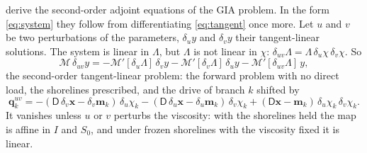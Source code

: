 \documentclass[11pt,a4paper]{article}
\numberwithin{equation}{section}
\begin{document}
\citet{YuEtAl2025} derive the second-order adjoint equations of the GIA
problem. In the form \eqref{eq:system} they follow from differentiating
\eqref{eq:tangent} once more. Let $u$ and $v$ be two perturbations of the
parameters, $\delta_{u}y$ and $\delta_{v}y$ their tangent-linear solutions. The
system is linear in $\Lambda$, but $\Lambda$ is not linear in $\chi$:
$\delta_{uv}\Lambda = \Lambda\,\delta_{u}\chi\,\delta_{v}\chi$. So
\begin{equation}
\mathcal{M}\,\delta_{uv}y = -\mathcal{M}'[\delta_{u}\Lambda]\,\delta_{v}y
 - \mathcal{M}'[\delta_{v}\Lambda]\,\delta_{u}y
 - \mathcal{M}'[\delta_{uv}\Lambda]\,y,
\label{eq:secondtangent}
\end{equation}
the second-order tangent-linear problem: the forward problem with no direct
load, the shorelines prescribed, and the drive of branch $k$ shifted by
\begin{equation}
\mathbf{q}^{uv}_{k} = -(\mathsf{D}\,\delta_{v}\mathbf{x}-\delta_{v}\mathbf{m}_{k})\,\delta_{u}\chi_{k}
 - (\mathsf{D}\,\delta_{u}\mathbf{x}-\delta_{u}\mathbf{m}_{k})\,\delta_{v}\chi_{k}
 + (\mathsf{D}\mathbf{x}-\mathbf{m}_{k})\,\delta_{u}\chi_{k}\,\delta_{v}\chi_{k}.
\label{eq:qsecond}
\end{equation}
It vanishes unless $u$ or $v$ perturbs the viscosity: with the shorelines held
the map is affine in $I$ and $S_{0}$, and under frozen shorelines with the
viscosity fixed it is linear.
\end{document}
